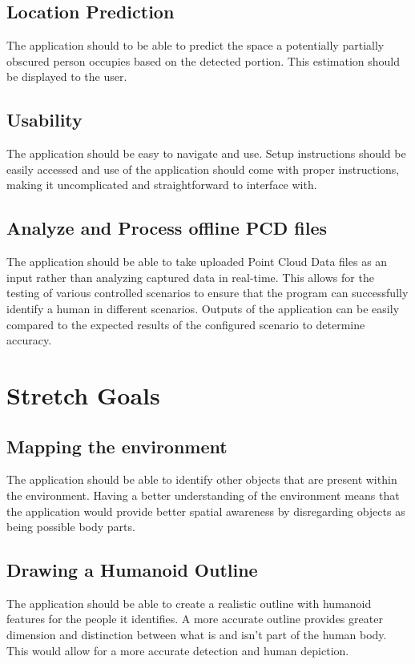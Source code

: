 \documentclass{article}
\begin{document}
\subsection{Location Prediction}
The application should to be able to predict the space a potentially partially obscured person occupies based on the detected portion. This estimation should be displayed to the user.

\subsection{Usability}
The application should be easy to navigate and use. Setup instructions should be easily accessed and use of the application should come with proper instructions, making it uncomplicated and straightforward to interface with.

\subsection{Analyze and Process offline PCD files}
The application should be able to take uploaded Point Cloud Data files as an input rather than analyzing captured data in real-time. This allows for the testing of various controlled scenarios to ensure that the program can successfully identify a human in different scenarios. Outputs of the application can be easily compared to the expected results of the configured scenario to determine accuracy.
        
\newpage
\section{Stretch Goals}

\subsection{Mapping the environment}
The application should be able to identify other objects that are present within the environment. Having a better understanding of the environment means that the application would provide better spatial awareness by disregarding objects as being possible body parts.

\subsection{Drawing a Humanoid Outline}
The application should be able to create a realistic outline with humanoid features for the people it identifies. A more accurate outline provides greater dimension and distinction between what is and isn’t part of the human body. This would allow for a more accurate detection and human depiction.
  
\end{document}
